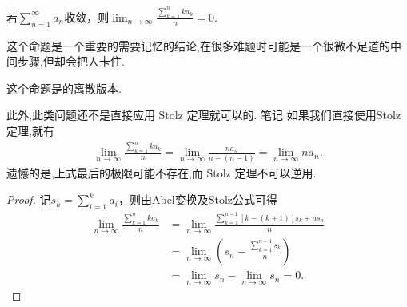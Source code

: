 \documentclass[../../main.tex]{subfiles}
\begin{document}
\begin{proposition}\label{proposition:级数收敛平均级数必收敛}
若$\sum_{n=1}^{\infty}a_n$收敛，则$\lim_{n\rightarrow \infty}\frac{\sum\limits_{k=1}^n{ka_k}}{n}=0$.
\end{proposition}
\begin{note}
这个命题是一个重要的需要记忆的结论,在很多难题时可能是一个很微不足道的中间步骤,但却会把人卡住.

这个命题是的离散版本.
\end{note}
\begin{remark}
此外,此类问题还不是直接应用 Stolz 定理就可以的.
笔记 如果我们直接使用Stolz 定理,就有
\begin{align*}
\lim_{n \to \infty} \frac{\sum\limits_{k=1}^n k a_k}{n} = \lim_{n \to \infty} \frac{n a_n}{n - (n - 1)} = \lim_{n \to \infty} n a_n.
\end{align*}
遗憾的是,上式最后的极限可能不存在,而 Stolz 定理不可以逆用.
\end{remark}
\begin{proof}
记$s_k=\sum_{i=1}^k{a_i}$，则由\hyperref[theorem:Abel变换]{Abel变换}及Stolz公式可得
\begin{align*}
\lim_{n\rightarrow \infty}\frac{\sum\limits_{k=1}^n{ka_k}}{n}&=\lim_{n\rightarrow \infty}\frac{\sum\limits_{k=1}^{n-1}\left[ k-\left( k+1 \right) \right] s_k+ns_n}{n}\\
&=\lim_{n\rightarrow \infty}\left( s_n-\frac{\sum\limits_{k=1}^{n-1}s_k}{n} \right)\\
&=\lim_{n\rightarrow \infty}s_n-\lim_{n\rightarrow \infty}s_n=0.
\end{align*}
\end{proof}
\end{document}
